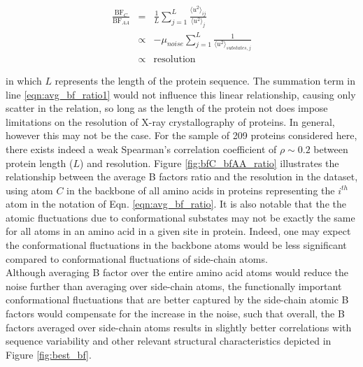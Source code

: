 \documentclass[11pt]{article}
\begin{document}
    \begin{eqnarray}
        \frac{\text{BF}_C}{\text{BF}_{AA}} &=& \frac{1}{L}\sum_{j=1}^{L}\frac{\langle u^2 \rangle_{ij}}{\langle u^2 \rangle_{j}} \label{eqn:avg_bf_ratio} \\
                                           &\propto& -\mu_{noise} \sum_{j=1}^{L}\frac{1}{\langle u^2 \rangle_{substates,j}} \label{eqn:avg_bf_ratio1} \\
                                           &\propto& \text{resolution}
    \end {eqnarray}

    \noindent in which $L$ represents the length of the protein sequence. The summation term in line \ref{eqn:avg_bf_ratio1} would not influence this linear relationship, causing only scatter in the relation, so long as the length of the protein not does impose limitations on the resolution of X-ray crystallography of proteins. In general, however this may not be the case. For the sample of 209 proteins considered here, there exists indeed a weak Spearman's correlation coefficient of $\rho\sim0.2$ between protein length ($L$) and resolution. Figure \ref{fig:bfC_bfAA_ratio} illustrates the relationship between the average B factors ratio and the resolution in the dataset, using atom $C$ in the backbone of all amino acids in proteins representing the $i^{th}$ atom in the notation of Eqn. \ref{eqn:avg_bf_ratio}. It is also notable that the the atomic fluctuations due to conformational substates may not be exactly the same for all atoms in an amino acid in a given site in protein. Indeed, one may expect the conformational fluctuations in the backbone atoms would be less significant compared to conformational fluctuations of side-chain atoms. \\

    Although averaging B factor over the entire amino acid atoms would reduce the noise further than averaging over side-chain atoms, the functionally important conformational fluctuations that are better captured by the side-chain atomic B factors would compensate for the increase in the noise, such that overall, the B factors averaged over side-chain atoms results in slightly better correlations with sequence variability and other relevant structural characteristics depicted in Figure \ref{fig:best_bf}. \\

    \label{app:best_crd}
\end{document}
